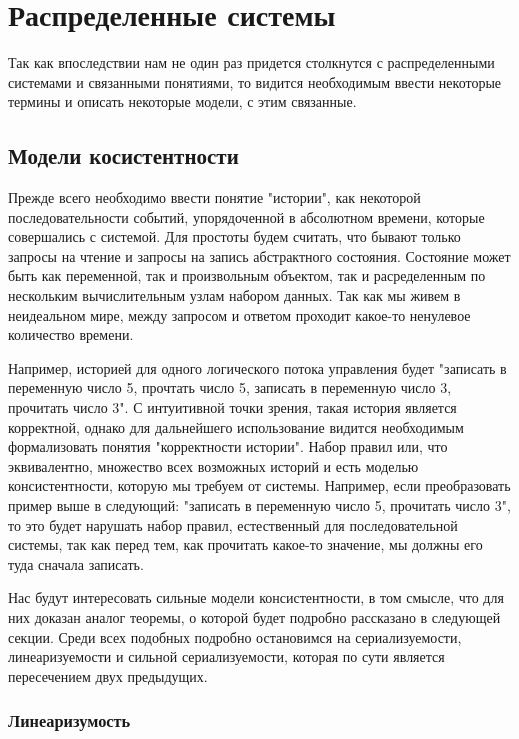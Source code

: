 \section{Распределенные системы}

Так как впоследствии нам не один раз придется столкнутся с распределенными системами и связанными понятиями, то видится необходимым ввести некоторые термины и описать некоторые модели, с этим связанные.

\subsection{Модели косистентности}

Прежде всего необходимо ввести понятие "истории", как некоторой последовательности событий, упорядоченной в абсолютном времени, которые совершались с системой. Для простоты будем считать, что бывают только запросы на чтение и запросы на запись абстрактного состояния. Состояние может быть как переменной, так и произвольным объектом, так и расределенным по нескольким вычислительным узлам набором данных. Так как мы живем в неидеальном мире, между запросом и ответом проходит какое-то ненулевое количество времени.

Например, историей для одного логического потока управления будет "записать в переменную число 5, прочтать число 5, записать в переменную число 3, прочитать число 3". С интуитивной точки зрения, такая история является корректной, однако для дальнейшего использование видится необходимым формализовать понятия "корректности истории". Набор правил или, что эквивалентно, множество всех возможных историй и есть моделью консистентности, которую мы требуем от системы. Например, если преобразовать пример выше в следующий: "записать в переменную число 5, прочитать число 3", то это будет нарушать набор правил, естественный для последовательной системы, так как перед тем, как прочитать какое-то значение, мы должны его туда сначала записать.

Нас будут интересовать сильные модели консистентности, в том смысле, что для них доказан аналог теоремы, о которой будет подробно рассказано в следующей секции. Среди всех подобных подробно остановимся на сериализуемости, линеаризуемости и сильной сериализуемости, которая по сути является пересечением двух предыдущих.

\subsubsection{Линеаризумость}

